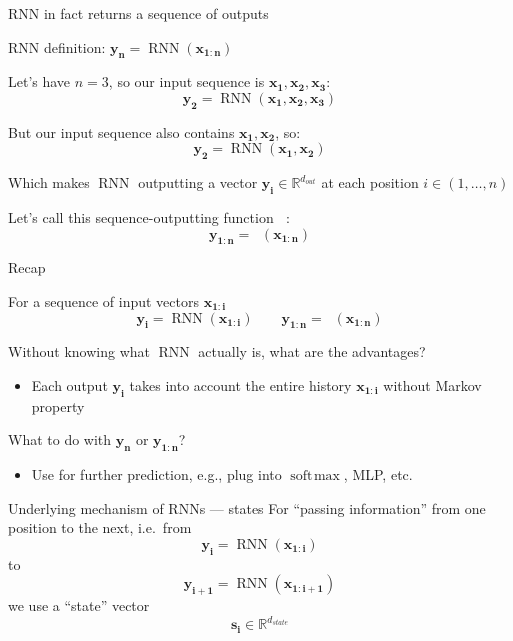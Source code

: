 \documentclass[12pt,aspectratio=169,handout]{beamer}
\DeclareMathOperator*{\softmax}{soft\!\max}
\DeclareMathOperator*{\rnn}{RNN}
\DeclareMathOperator*{\rnnstar}{RNN^{*}}
\begin{document}
\begin{frame}{RNN in fact returns a sequence of outputs}

RNN definition: $\bm{y_n} = \rnn (\bm{x_{1:n}})$

Let's have $n = 3$, so our input sequence is $\bm{x_{1}}, \bm{x_2}, \bm{x_3}$:
$$
\bm{y_2} = \rnn (\bm{x_{1}}, \bm{x_2}, \bm{x_3})
$$

\pause

But our input sequence also contains $\bm{x_{1}}, \bm{x_2}$, so:
$$
\bm{y_2} = \rnn (\bm{x_{1}}, \bm{x_2})
$$

Which makes $\rnn$ outputting a vector $\bm{y_i} \in \mathbb{R}^{d_{out}}$ at each position $i \in (1, \ldots, n)$

Let's call this sequence-outputting function $\rnnstar$:
$$
\bm{y_{1:n}} = \rnnstar (\bm{x_{1:n}})
$$

\end{frame}



\begin{frame}{Recap}

For a sequence of input vectors  $\bm{x_{1:i}}$
$$
\bm{y_i} = \rnn (\bm{x_{1:i}}) \qquad
\bm{y_{1:n}} = \rnnstar (\bm{x_{1:n}})
$$

\pause

Without knowing what $\rnn$ actually is, what are the advantages?
\pause
\begin{itemize}
	\item Each output $\bm{y_i}$ takes into account the entire history $\bm{x_{1:i}}$ without Markov property
\end{itemize}

What to do with $\bm{y_n}$ or $\bm{y_{1:n}}$?
\pause
\begin{itemize}
	\item Use for further prediction, e.g., plug into $\softmax$, MLP, etc.
\end{itemize}

\end{frame}


\begin{frame}{Underlying mechanism of RNNs --- states}
For ``passing information'' from one position to the next, i.e.\ from
$$\bm{y_i} = \rnn (\bm{x_{1:i}})$$
to
$$\bm{y_{i+1}} = \rnn (\bm{x_{1:i+1}})$$
we use a ``state'' vector
$$\bm{s_i} \in \mathbb{R}^{d_{state}}$$
\end{frame}
\end{document}
